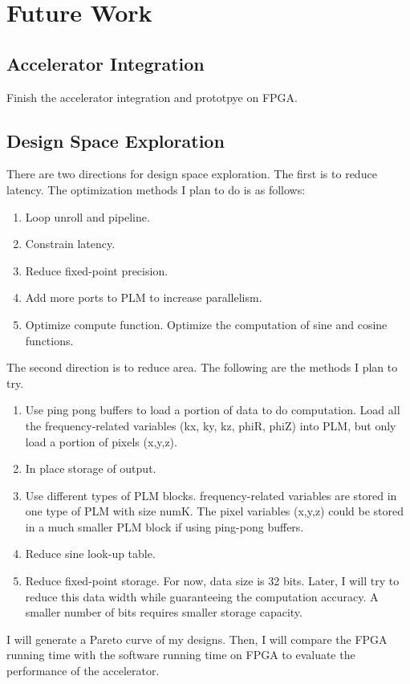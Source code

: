 \section{Future Work}

\subsection{Accelerator Integration}
Finish the accelerator integration and prototpye on FPGA.

\subsection{Design Space Exploration}
There are two directions for design space exploration. The first is to reduce latency. The optimization methods I plan to do is as follows:
\begin{enumerate}
\setlength\itemsep{-0.15em}
\item Loop unroll and pipeline.
\item Constrain latency.
\item Reduce fixed-point precision.
\item Add more ports to PLM to increase parallelism.
\item Optimize compute function. Optimize the computation of sine and cosine functions.
\end{enumerate}
The second direction is to reduce area. The following are the methods I plan to try.
\begin{enumerate}
\setlength\itemsep{-0.15em}
    \item Use ping pong buffers to load a portion of data to do computation. Load all the frequency-related variables (kx, ky, kz, phiR, phiZ) into PLM, but only load a portion of pixels (x,y,z). 
    \item In place storage of output. 
    \item Use different types of PLM blocks. frequency-related variables are stored in one type of PLM with size numK. The pixel variables (x,y,z) could be stored in a much smaller PLM block if using ping-pong buffers. 
    \item Reduce sine look-up table.  
    \item Reduce fixed-point storage. For now, data size is 32 bits. Later, I will try to reduce this data width while guaranteeing the computation accuracy. A smaller number of bits requires smaller storage capacity.
\end{enumerate}

I will generate a Pareto curve of my designs. Then, I will compare the FPGA running time with the software running time on FPGA to evaluate the performance of the accelerator.
